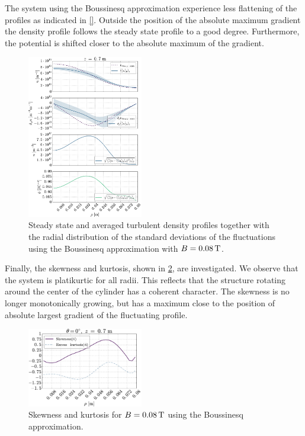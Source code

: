 The system using the Boussinesq approximation experience less flattening of the profiles as indicated in \cref{}.
Outside the position of the absolute maximum gradient the density profile follows the steady state profile to a good degree.
Furthermore, the potential is shifted closer to the absolute maximum of the gradient.
%
\begin{figure}[htb]
    \centering
    \includegraphics[width=0.45\textwidth]{fig/results/compareBouss/fluctProfiles008B}
    \caption{Steady state and averaged turbulent density profiles together with the radial distribution of the standard deviations of the fluctuations using the Boussinesq approximation with $B=0.08\, \text{T}$.}
    \label{fig:posOfFluct008B}
\end{figure}
%
Finally, the skewness and kurtosis, shown in \cref{fig:skewKurt008B}, are investigated.
We observe that the system is platikurtic for all radii.
This reflects that the structure rotating around the center of the cylinder has a coherent character.
The skewness is no longer monotonically growing, but has a maximum close to the position of absolute largest gradient of the fluctuating profile.
%
\begin{figure}[htb]
    \centering
    \includegraphics[width=0.45\textwidth]{fig/results/compareBouss/skewKurt008B}
    \caption{Skewness and kurtosis for $B=0.08\, \text{T}$ using the Boussinesq approximation.}
    \label{fig:skewKurt008B}
\end{figure}
%

